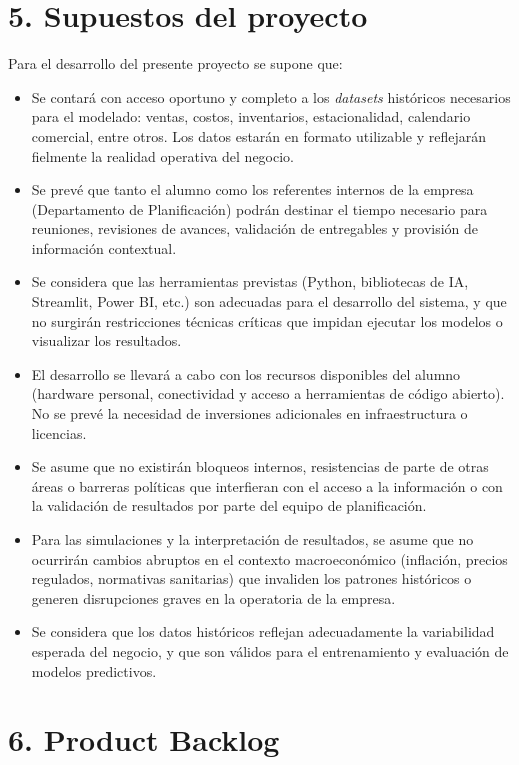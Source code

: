 \documentclass[
11pt, %
]{charter}
\begin{document}
\section{5. Supuestos del proyecto}
\label{sec:supuestos}

Para el desarrollo del presente proyecto se supone que:

\begin{itemize}
	\item Se contará con acceso oportuno y completo a los \textit{datasets} históricos necesarios para el modelado: ventas, costos, inventarios, estacionalidad, calendario comercial, entre otros. Los datos estarán en formato utilizable y reflejarán fielmente la realidad operativa del negocio.
	\item Se prevé que tanto el alumno como los referentes internos de la empresa (Departamento de Planificación) podrán destinar el tiempo necesario para reuniones, revisiones de avances, validación de entregables y provisión de información contextual.
	\item Se considera que las herramientas previstas (Python, bibliotecas de IA, Streamlit, Power BI, etc.) son adecuadas para el desarrollo del sistema, y que no surgirán restricciones técnicas críticas que impidan ejecutar los modelos o visualizar los resultados.
	\item El desarrollo se llevará a cabo con los recursos disponibles del alumno (hardware personal, conectividad y acceso a herramientas de código abierto). No se prevé la necesidad de inversiones adicionales en infraestructura o licencias.
	
	\item Se asume que no existirán bloqueos internos, resistencias de parte de otras áreas o barreras políticas que interfieran con el acceso a la información o con la validación de resultados por parte del equipo de planificación.
	\item Para las simulaciones y la interpretación de resultados, se asume que no ocurrirán cambios abruptos en el contexto macroeconómico (inflación, precios regulados, normativas sanitarias) que invaliden los patrones históricos o generen disrupciones graves en la operatoria de la empresa.
	\item Se considera que los datos históricos reflejan adecuadamente la variabilidad esperada del negocio, y que son válidos para el entrenamiento y evaluación de modelos predictivos.
\end{itemize}
\newpage

\section{6. Product Backlog}
\label{sec:backlog}
\end{document}
